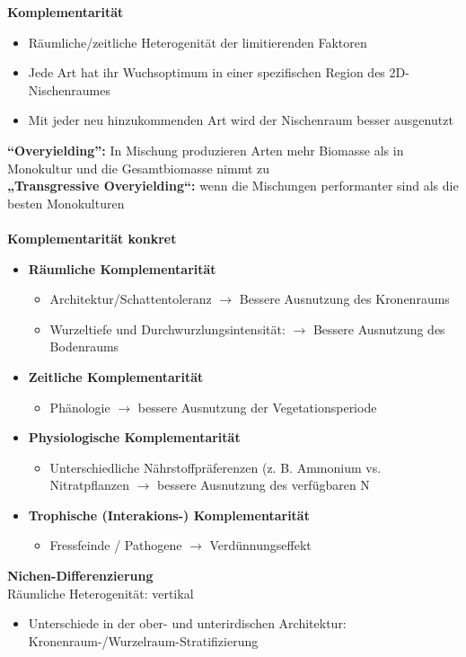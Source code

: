 \textbf{Komplementarität}
\begin{itemize}
	\item Räumliche/zeitliche Heterogenität der limitierenden Faktoren
	\item Jede Art hat ihr Wuchsoptimum in einer spezifischen Region des 2D-Nischenraumes
	\item Mit jeder neu hinzukommenden Art wird der Nischenraum besser ausgenutzt
\end{itemize}

\textbf{“Overyielding”:} In Mischung produzieren Arten mehr Biomasse als in Monokultur und die Gesamtbiomasse nimmt zu\\
\textbf{„Transgressive Overyielding“:} wenn die Mischungen performanter sind als die besten Monokulturen
\\\\
\textbf{Komplementarität konkret}
\begin{itemize}
	\item \textbf{Räumliche Komplementarität}
	\begin{itemize}
		\item Architektur/Schattentoleranz $\rightarrow$ Bessere Ausnutzung des
Kronenraums
		\item Wurzeltiefe und Durchwurzlungsintensität: $\rightarrow$ Bessere Ausnutzung des Bodenraums
	\end{itemize}
	\item \textbf{Zeitliche Komplementarität}
	\begin{itemize}
		\item Phänologie $\rightarrow$ bessere Ausnutzung der Vegetationsperiode
	\end{itemize}
	\item \textbf{Physiologische Komplementarität}
	\begin{itemize}
		\item Unterschiedliche Nährstoffpräferenzen (z. B. Ammonium vs. Nitratpflanzen $\rightarrow$ bessere Ausnutzung des verfügbaren N
	\end{itemize}
	\item \textbf{Trophische (Interakions-) Komplementarität}
	\begin{itemize}
		\item Fressfeinde / Pathogene $\rightarrow$ Verdünnungseffekt
	\end{itemize}
\end{itemize}

\textbf{Nichen-Differenzierung}\\
Räumliche Heterogenität: vertikal
\begin{itemize}
	\item Unterschiede in der ober- und unterirdischen Architektur: Kronenraum-/Wurzelraum-Stratifizierung
\end{itemize}

